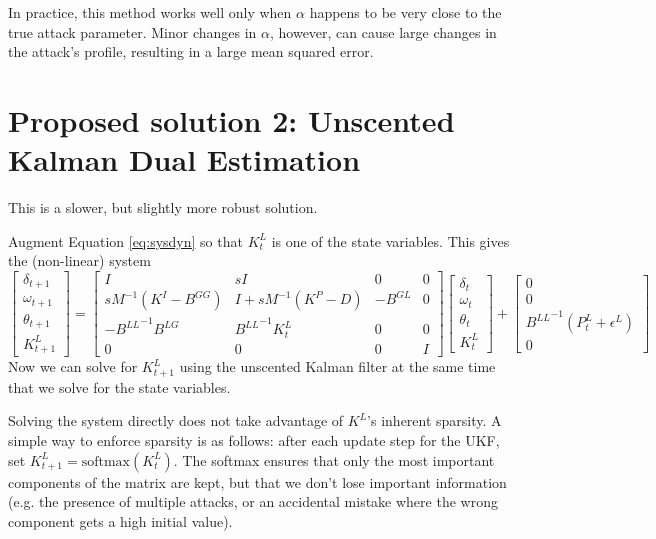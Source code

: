 \documentclass{article}
\begin{document}
In practice, this method works well only when $\alpha$ happens to be very close to the true attack parameter.
Minor changes in $\alpha$, however, can cause large changes in the attack's profile,
resulting in a large mean squared error.

\section*{Proposed solution 2: Unscented Kalman Dual Estimation}

This is a slower, but slightly more robust solution.

Augment Equation \ref{eq:sysdyn} so that $K_t^L$ is one of the state variables.
This gives the (non-linear) system
\begin{equation}
\begin{bmatrix}
\delta_{t+1} \\
\omega_{t+1} \\
\theta_{t+1} \\
K^L_{t+1}
\end{bmatrix}
=
\begin{bmatrix}
I & sI & 0 & 0 \\
sM^{-1}(K^I-B^{GG}) & I + sM^{-1}(K^P-D) & -B^{GL} & 0\\
-{B^{LL}}^{-1}B^{LG} & {B^{LL}}^{-1}K^L_t & 0 & 0 \\
0 & 0 & 0 & I
\end{bmatrix}
\begin{bmatrix}
\delta_{t} \\
\omega_{t} \\
\theta_{t} \\
K^L_t
\end{bmatrix}
+
\begin{bmatrix}
0 \\
0 \\
{B^{LL}}^{-1}(P^L_t + \epsilon^L) \\
0
\end{bmatrix}
\end{equation}
Now we can solve for $K^L_{t+1}$ using the unscented Kalman filter at the same time that we solve for the state variables.

Solving the system directly does not take advantage of $K^L$'s inherent sparsity.
A simple way to enforce sparsity is as follows:
after each update step for the UKF,
set $K^L_{t+1} = \text{softmax}(K^L_t)$.
The softmax ensures that only the most important components of the matrix are kept, but that we don't lose important information (e.g. the presence of multiple attacks, or an accidental mistake where the wrong component gets a high initial value).
\end{document}
